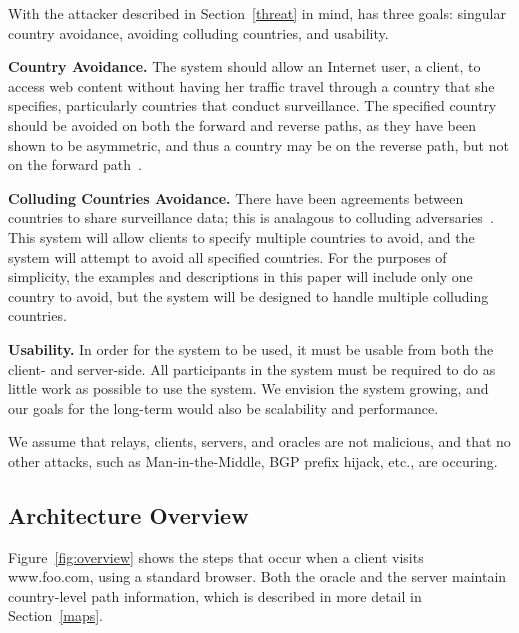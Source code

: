 With the attacker described in Section~\ref{threat} in mind, \system{} has three goals: singular country avoidance, avoiding colluding countries, and usability.  

{\bf Country Avoidance.}  The system should allow an Internet user, a client, to access web content without having her traffic travel through a country that she specifies, particularly countries that conduct surveillance.  The specified country should be avoided on both the forward and reverse paths, as they have been shown to be asymmetric, and thus a country may be on the reverse path, but not on the forward path~\cite{he2005routing}.  

{\bf Colluding Countries Avoidance.}  There have been agreements between countries to share surveillance data; this is analagous to colluding adversaries~\cite{fiveeyes}.  This system will allow clients to specify multiple countries to avoid, and the system will attempt to avoid all specified countries.  For the purposes of simplicity, the examples and descriptions in this paper will include only one country to avoid, but the system will be designed to handle multiple colluding countries.

{\bf Usability.} In order for the system to be used, it must be usable from both the client- and server-side.  All participants in the system must be required to do as little work as possible to use the system.  We envision the system growing, and our goals for the long-term would also be scalability and performance.

We assume that relays, clients, servers, and oracles are not malicious, and that no other attacks, such as Man-in-the-Middle, BGP prefix hijack, etc., are occuring.

\subsection{Architecture Overview}

Figure~\ref{fig:overview} shows the steps that occur when a client visits www.foo.com, using a standard browser. Both the oracle and the server maintain country-level path information, which is described in more detail in Section~\ref{maps}.

